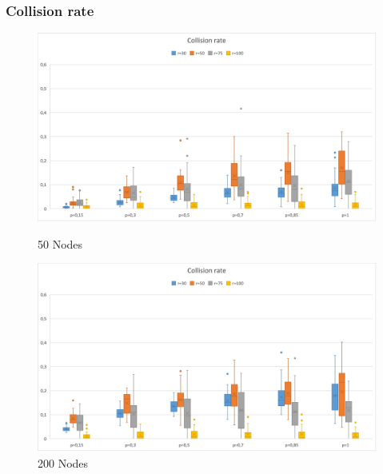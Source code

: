 \subsubsection{Collision rate}
\begin{figure}[H]
  \includegraphics[width=\linewidth]{./images/Collision50Boxplot.png}
  \caption{50 Nodes}\label{fig:awesome_image1}
\endminipage\hfill
{}
  \includegraphics[width=\linewidth]{./images/Collision200BoxplotScaled.png}
  \caption{200 Nodes}\label{fig:awesome_image2}
\endminipage
\end{figure}

